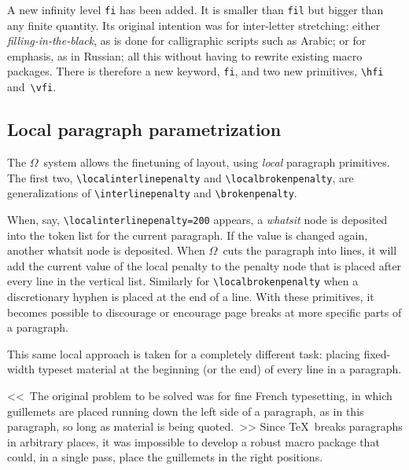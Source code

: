 \documentclass[fleqn]{article}
\newcommand{\OMEGA}{$\Omega$}
\begin{document}
A new infinity level \texttt{fi} has been added.  It is smaller than
\texttt{fil} but bigger than any finite quantity.  Its original intention
was for inter-letter stretching: either \emph{filling-in-the-black},
as is done for calligraphic scripts such as Arabic; or for emphasis,
as in Russian; all this without having to rewrite existing macro packages.
There is therefore a new keyword, \texttt{fi}, and two new primitives,
\verb|\hfi| and~\verb|\vfi|.

\subsection{Local paragraph parametrization}

The \OMEGA\ system allows the finetuning of layout, using
\emph{local} paragraph primitives.  The first two,
\verb|\localinterlinepenalty| and \verb|\localbrokenpenalty|, are
generalizations of \verb|\interlinepenalty| and \verb|\brokenpenalty|.

When, say,  \verb|\localinterlinepenalty=200| appears,  a \emph{whatsit} node
is deposited into the token list for the current paragraph.  If the
value is changed again, another whatsit node is deposited.  When
\OMEGA\ cuts the paragraph into lines, it will add the current value
of the local penalty to the penalty node that is placed after every line
in the vertical list.  Similarly for \verb|\localbrokenpenalty| when a
discretionary hyphen is placed at the end of a line.  With these primitives,
it becomes possible to discourage or encourage page breaks at more
specific parts of a paragraph.

This same local approach is taken for a completely different task:  placing
fixed-width typeset material at the beginning (or the end) of every
line in a paragraph.

{<<~\localleftbox{<<~}The original problem to be solved
was for fine French typesetting, in which guillemets
are placed running down the left side of a paragraph,
as in this paragraph, so long as material is being
quoted.~>>} Since \TeX\ breaks paragraphs in arbitrary
places, it was impossible to develop a robust macro
package that could, in a single pass, place the
guillemets in the right positions.
\end{document}
